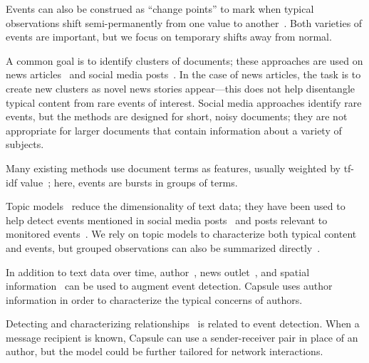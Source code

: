 Events can also be construed as ``change points'' to mark when typical observations shift semi-permanently from one value to another~\cite{guralnik1999event,adams2007bayesian}. Both varieties of events are important, but we focus on temporary shifts away from normal.

A common goal is to identify clusters of documents; these approaches are used on news articles~\cite{zhao2012novel,zhao2007temporal,zhang2002novelty,li2005probabilistic,wang2007mining,allan1998line} and social media posts~\cite{VanDam:2012,lau2012line,jackoway2011identification,sakaki2010earthquake,reuter2012event,becker2010learning,sayyadi2009event}.
In the case of news articles, the task is to create new clusters as novel news stories appear---this does not help disentangle typical content from rare events of interest.
Social media approaches identify rare events, but the methods are designed for short, noisy documents; they are not appropriate for larger documents that contain information about a variety of subjects.

Many existing methods use document terms as features, usually weighted by tf-idf value~\cite{fung2005parameter,kumaran2004text,brants2003system,das2011dynamic,zhao2007temporal,zhao2012novel}; here, events are bursts in groups of terms. %

Topic models~\cite{Blei:2012} reduce the dimensionality of text data; they have been used to help detect events mentioned in social media posts~\cite{lau2012line,dou2012leadline} and posts relevant to monitored events~\cite{VanDam:2012}.
We rely on topic models to characterize both typical content and events, but grouped observations can also be summarized directly~\cite{peng2007event,chakrabarti2011event,gao2012joint}.

In addition to text data over time, author~\cite{zhao2007temporal}, news outlet~\cite{wang2007mining}, and spatial information~\cite{Neill:2005,mathioudakis2010identifying,liu2011using} can be used to augment event detection.  Capsule uses author information in order to characterize the typical concerns of authors.

Detecting and characterizing relationships~\cite{schein2015bayesian,linderman2014discovering,das2011dynamic} is related to event detection.  When a message recipient is known, Capsule can use a sender-receiver pair in place of an author, but the model could be further tailored for network interactions.

